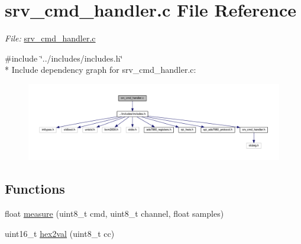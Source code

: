 \hypertarget{a00042}{\section{srv\-\_\-cmd\-\_\-handler.\-c File Reference}
\label{d5/db6/a00042}
}


{\itshape File\-:} \hyperlink{a00042}{srv\-\_\-cmd\-\_\-handler.\-c} \par
  


{\ttfamily \#include \char`\"{}../includes/includes.\-h\char`\"{}}\\*
Include dependency graph for srv\-\_\-cmd\-\_\-handler.\-c\-:\nopagebreak
\begin{figure}[H]
\begin{center}
\leavevmode
\includegraphics[width=350pt]{d1/dea/a00054}
\end{center}
\end{figure}
\subsection*{Functions}
{\bf }\par
\begin{DoxyCompactItemize}
\item 
float \hyperlink{a00009_gac914ebaa64afce03ee852af09659cf69}{measure} (uint8\-\_\-t cmd, uint8\-\_\-t channel, float samples)
\begin{DoxyCompactList}\small\item\em 

 \end{DoxyCompactList}\end{DoxyCompactItemize}

{\bf }\par
\begin{DoxyCompactItemize}
\item 
uint16\-\_\-t \hyperlink{a00009_gab120dc4bec6b4097a5cd3ebb91131c57}{hex2val} (uint8\-\_\-t cc)
\begin{DoxyCompactList}\small\item\em 

 \end{DoxyCompactList}\end{DoxyCompactItemize}


